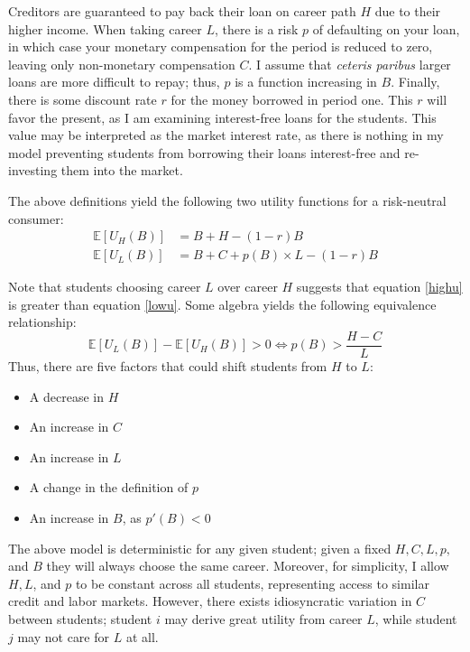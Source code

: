 \documentclass[12pt]{article}
\begin{document}
	Creditors are guaranteed to pay back their loan on career path $H$ due to their higher income. When taking career $L$, there is a risk $p$ of defaulting on your loan, in which case your monetary compensation for the period is reduced to zero, leaving only non-monetary compensation $C$. I assume that \emph{ceteris paribus} larger loans are more difficult to repay; thus, $p$ is a function increasing in $B$. Finally, there is some discount rate $r$ for the money borrowed in period one. This $r$ will favor the present, as I am examining interest-free loans for the students. This value may be interpreted as the market interest rate, as there is nothing in my model preventing students from borrowing their loans interest-free and re-investing them into the market. 
	
	The above definitions yield the following two utility functions for a risk-neutral consumer: 
	\begin{align}
	\mathbb{E}\left[U_H(B)\right] &= B + H - (1 - r)B \label{highu}\\
	\mathbb{E}\left[U_L(B)\right] &= B + C + p(B) \times L - (1 - r)B \label{lowu}
	\end{align}
	
	Note that students choosing career $L$ over career $H$ suggests that equation \ref{highu} is greater than equation \ref{lowu}. Some algebra yields the following equivalence relationship: 
	\begin{equation}
	\mathbb{E}\left[U_L(B)\right] - \mathbb{E}\left[U_H(B)\right] > 0 \iff p(B) > \frac{H - C}{L} \label{choicecon}
	\end{equation} 
	Thus, there are five factors that could shift students from $H$ to $L$:
	\begin{itemize}
		\singlespacing
		\item A decrease in $H$
		\item An increase in $C$
		\item An increase in $L$
		\item A change in the definition of $p$
		\item An increase in $B$, as $p'(B) < 0$
	\end{itemize}

	The above model is deterministic for any given student; given a fixed $H, C, L, p,$ and $B$ they will always choose the same career. Moreover, for simplicity, I allow $H, L$, and $p$ to be constant across all students, representing access to similar credit and labor markets. However, there exists idiosyncratic variation in $C$ between students; student $i$ may derive great utility from career $L$, while student $j$ may not care for $L$ at all.
\end{document}
